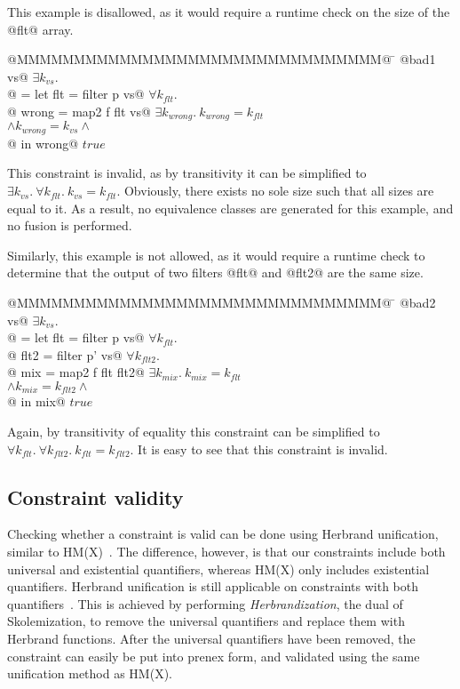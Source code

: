 This example is disallowed, as it would require a runtime check on the size of the @flt@ array.
\begin{tabbing}
@MMMMMMMMMMMMMMMMMMMMMMMMMMMMMMMM@  \= \kill
@bad1 vs@                           \> $\exists k_{vs}.$ \\
@ = let flt   = filter p vs@        \> $\forall k_{flt}.$ \\
@       wrong = map2   f flt vs@    \> $\exists k_{wrong}.\ k_{wrong} = k_{flt}$ \\
                                    \> $\wedge k_{wrong} = k_{vs} \wedge$ \\
@   in  wrong@                      \> $true$
\end{tabbing}
This constraint is invalid, as by transitivity it can be simplified to $\exists k_{vs}.\ \forall k_{flt}.\ k_{vs} = k_{flt}$.
Obviously, there exists no sole size such that all sizes are equal to it.
As a result, no equivalence classes are generated for this example, and no fusion is performed.


Similarly, this example is not allowed, as it would require a runtime check to determine that the output of two filters @flt@ and @flt2@ are the same size.
\begin{tabbing}
@MMMMMMMMMMMMMMMMMMMMMMMMMMMMMMMM@  \= \kill
@bad2 vs@                           \> $\exists k_{vs}.$ \\
@ = let flt  = filter p  vs@        \> $\forall k_{flt}.$ \\
@       flt2 = filter p' vs@        \> $\forall k_{flt2}.$ \\
@       mix  = map2   f  flt flt2@  \> $\exists k_{mix}.\ k_{mix} = k_{flt}$ \\
                                    \> $\wedge k_{mix} = k_{flt2} \wedge$ \\
@   in  mix@                        \> $true$                               \\
\end{tabbing}
Again, by transitivity of equality this constraint can be simplified to $\forall k_{flt}.\ \forall k_{flt2}.\ k_{flt} = k_{flt2}$.
It is easy to see that this constraint is invalid.

\subsection{Constraint validity}
Checking whether a constraint is valid can be done using Herbrand unification, similar to HM(X)~\cite{odersky1999type}.
The difference, however, is that our constraints include both universal and existential quantifiers, whereas HM(X) only includes existential quantifiers.
Herbrand unification is still applicable on constraints with both quantifiers~\cite{buss1995herbrand}.
This is achieved by performing \emph{Herbrandization}, the dual of Skolemization, to remove the universal quantifiers and replace them with Herbrand functions.
After the universal quantifiers have been removed, the constraint can easily be put into prenex form, and validated using the same unification method as HM(X).

